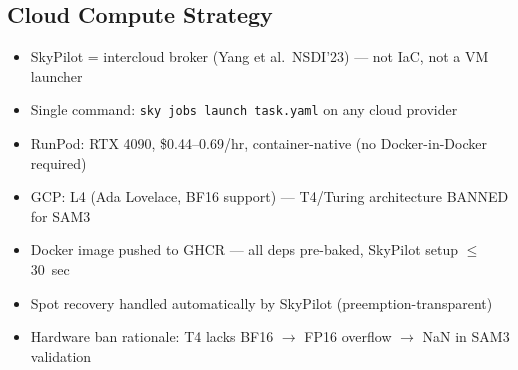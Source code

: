 
\subsection{Cloud Compute Strategy}
\begin{itemize}
  \item SkyPilot = intercloud broker (Yang et al.\ NSDI'23) --- not IaC, not a VM launcher
  \item Single command: \texttt{sky jobs launch task.yaml} on any cloud provider
  \item RunPod: RTX 4090, \$0.44--0.69/hr, container-native (no Docker-in-Docker required)
  \item GCP: L4 (Ada Lovelace, BF16 support) --- T4/Turing architecture BANNED for SAM3
  \item Docker image pushed to GHCR --- all deps pre-baked, SkyPilot setup $\leq$30~sec
  \item Spot recovery handled automatically by SkyPilot (preemption-transparent)
  \item Hardware ban rationale: T4 lacks BF16 $\to$ FP16 overflow $\to$ NaN in SAM3 validation
\end{itemize}
